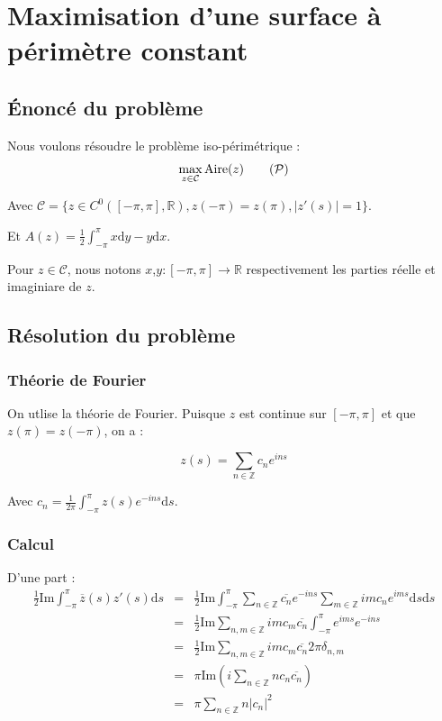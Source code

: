 \documentclass[10pt,a4paper]{article}
\newcommand{\R}{\mathbb{R}}
\newcommand{\Z}{\mathbb{Z}}
\renewcommand{\d}{\mathrm{d}}
\renewcommand{\P}{\mathcal{P}}
\newcommand{\A}{\mathrm{Aire}}
\renewcommand{\Im}{\mathrm{Im}}
\theoremstyle{plain}
\theoremstyle{definition}
\begin{document}
\section{Maximisation d'une surface à périmètre constant}

\subsection{Énoncé du problème}

Nous voulons résoudre le problème iso-périmétrique :
\[\max_{z \in \mathcal{C}} \A(z) \label{eq:p}\tag{$\P$}\]


Avec $\mathcal{C} = \{ z \in C^0([-\pi,\pi], \R), z(-\pi)=z(\pi), |z'(s)|=1 \}$.

Et $A(z) = \frac{1}{2} \int_{-\pi}^{\pi}{x\d y-y\d x}$.


Pour $z\in \mathcal{C}$, nous notons $x$,$y : [-\pi,\pi] \rightarrow \R$ respectivement les parties réelle et imaginiare de $z$.



\subsection[Résolution du problème]{Résolution du problème \cite{fuglede86}}


\subsubsection{Théorie de Fourier}

On utlise la théorie de Fourier. Puisque $z$ est continue sur $[-\pi,\pi]$ et que $z(\pi)=z(-\pi)$, on a :

\[ z(s) = \sum_{n \in \Z}{c_n e^{ins}} \]

Avec $c_n = \frac{1}{2\pi} \int_{-\pi}^{\pi}{z(s)e^{-ins}\d s}$.

\subsubsection{Calcul}

D'une part :
\begin{eqnarray*}
\frac{1}{2} \Im \int_{-\pi}^{\pi}{\overline{z}(s) z'(s) \d s} &=& \frac{1}{2} \Im \int_{-\pi}^{\pi}{ \sum_{n\in \Z}{\overline{c_n} e^{-ins}} \sum_{m\in \Z}{imc_n e^{ims}} \d s}\d s\\
&=& \frac{1}{2} \Im \sum_{n,m\in \Z}{ im c_m \overline{c_n} \int_{-\pi}^{\pi}{e^{ims}e^{-ins}} } \\
&=& \frac{1}{2} \Im \sum_{n,m\in \Z}{ im c_m \overline{c_n} 2\pi \delta_{n,m} } \\
&=& \pi \Im\left( i\sum_{n\in \Z}{ n c_n \overline{c_n}}\right) \\
&=& \pi \sum_{n\in \Z}{ n |c_n|^2}
\end{eqnarray*}
\end{document}
